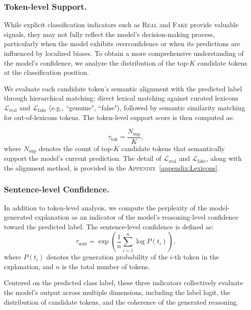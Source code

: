\subsubsection{Token-level Support.}
While explicit classification indicators such as \textsc{Real} and \textsc{Fake} provide valuable signals, they may not fully reflect the model's decision-making process, particularly when the model exhibits overconfidence or when its predictions are influenced by localized biases. To obtain a more comprehensive understanding of the model's confidence, we analyze the distribution of the top-$K$ candidate tokens at the classification position.

We evaluate each candidate token's semantic alignment with the predicted label through hierarchical matching: direct lexical matching against curated lexicons $\mathcal{L}_{\text{real}}$ and $\mathcal{L}_{\text{fake}}$ (e.g., ``genuine", ``false"), followed by semantic similarity matching for out-of-lexicons tokens. The token-level support score is then computed as:

\begin{equation} \tau_{\text{tok}} = \frac{N_{\text{sup}}}{K}, \end{equation}
where $N_{\text{sup}}$ denotes the count of top-$K$ candidate tokens that semantically support the model's current prediction.
The detail of $\mathcal{L}_{\text{real}}$ and $\mathcal{L}_{\text{fake}}$, along with the alignment method, is provided in the \textsc{Appendix}~\ref{appendix:Lexicons}.
\subsubsection{Sentence-level Confidence. }
In addition to token-level analysis, we compute the perplexity of the model-generated explanation as an indicator of the model’s reasoning-level confidence toward the predicted label. The sentence-level confidence is defined as:
\begin{equation}
\tau_{\text{sent}} = \exp\left(\frac{1}{n} \sum_{i=1}^{n} \log P(t_i)\right) ,
\end{equation}
where $P(t_i)$ denotes the generation probability of the $i$-th token in the explanation, and 
$n$ is the total number of tokens. 

Centered on the predicted class label, these three indicators collectively evaluate the model’s output across multiple dimensions, including the label logit, the distribution of candidate tokens, and the coherence of the generated reasoning.

